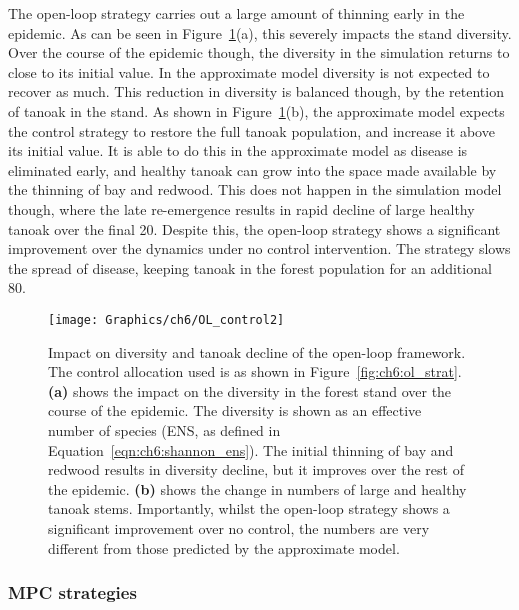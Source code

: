 The open-loop strategy carries out a large amount of thinning early in the epidemic. As can be seen in Figure~\ref{fig:ch6:ol_div_tan}(a), this severely impacts the stand diversity. Over the course of the epidemic though, the diversity in the simulation returns to close to its initial value. In the approximate model diversity is not expected to recover as much. This reduction in diversity is balanced though, by the retention of tanoak in the stand. As shown in Figure~\ref{fig:ch6:ol_div_tan}(b), the approximate model expects the control strategy to restore the full tanoak population, and increase it above its initial value. It is able to do this in the approximate model as disease is eliminated early, and healthy tanoak can grow into the space made available by the thinning of bay and redwood. This does not happen in the simulation model though, where the late re-emergence results in rapid decline of large healthy tanoak over the final \SI{20}{\years}. Despite this, the open-loop strategy shows a significant improvement over the dynamics under no control intervention. The strategy slows the spread of disease, keeping tanoak in the forest population for an additional \SI{80}{\years}.

\begin{figure}[t]
    \begin{center}
        \texttt{[image: Graphics/ch6/OL\_control2]}
        \caption[Open-loop strategy diversity and tanoak decline]{Impact on diversity and tanoak decline of the open-loop framework. The control allocation used is as shown in Figure~\ref{fig:ch6:ol_strat}. \textbf{(a)} shows the impact on the diversity in the forest stand over the course of the epidemic. The diversity is shown as an effective number of species (ENS, as defined in Equation~\ref{eqn:ch6:shannon_ens}). The initial thinning of bay and redwood results in diversity decline, but it improves over the rest of the epidemic. \textbf{(b)} shows the change in numbers of large and healthy tanoak stems. Importantly, whilst the open-loop strategy shows a significant improvement over no control, the numbers are very different from those predicted by the approximate model.\label{fig:ch6:ol_div_tan}}
    \end{center}
\end{figure}

\subsubsection{MPC strategies}

